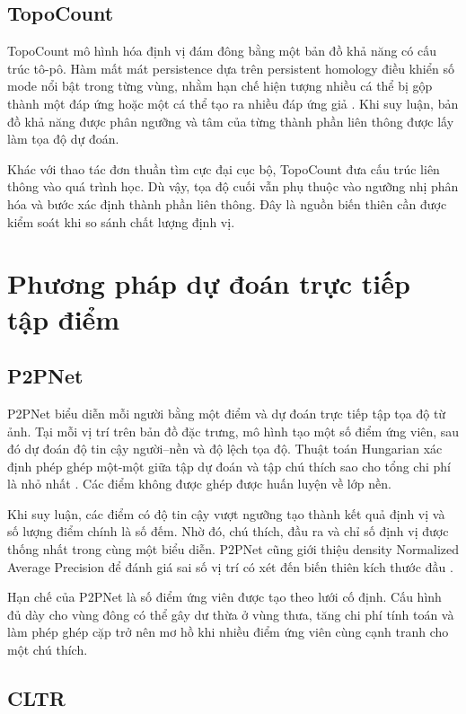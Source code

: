 \subsection{TopoCount}

TopoCount mô hình hóa định vị đám đông bằng một bản đồ khả năng có cấu trúc tô-pô. Hàm mất mát persistence dựa trên persistent homology điều khiển số mode nổi bật trong từng vùng, nhằm hạn chế hiện tượng nhiều cá thể bị gộp thành một đáp ứng hoặc một cá thể tạo ra nhiều đáp ứng giả \cite{abousamra2021topocount}. Khi suy luận, bản đồ khả năng được phân ngưỡng và tâm của từng thành phần liên thông được lấy làm tọa độ dự đoán.

Khác với thao tác đơn thuần tìm cực đại cục bộ, TopoCount đưa cấu trúc liên thông vào quá trình học. Dù vậy, tọa độ cuối vẫn phụ thuộc vào ngưỡng nhị phân hóa và bước xác định thành phần liên thông. Đây là nguồn biến thiên cần được kiểm soát khi so sánh chất lượng định vị.

\section{Phương pháp dự đoán trực tiếp tập điểm}

\subsection{P2PNet}

P2PNet biểu diễn mỗi người bằng một điểm và dự đoán trực tiếp tập tọa độ từ ảnh. Tại mỗi vị trí trên bản đồ đặc trưng, mô hình tạo một số điểm ứng viên, sau đó dự đoán độ tin cậy người--nền và độ lệch tọa độ. Thuật toán Hungarian xác định phép ghép một-một giữa tập dự đoán và tập chú thích sao cho tổng chi phí là nhỏ nhất \cite{song2021p2pnet}. Các điểm không được ghép được huấn luyện về lớp nền.

Khi suy luận, các điểm có độ tin cậy vượt ngưỡng tạo thành kết quả định vị và số lượng điểm chính là số đếm. Nhờ đó, chú thích, đầu ra và chỉ số định vị được thống nhất trong cùng một biểu diễn. P2PNet cũng giới thiệu density Normalized Average Precision để đánh giá sai số vị trí có xét đến biến thiên kích thước đầu \cite{song2021p2pnet}.

Hạn chế của P2PNet là số điểm ứng viên được tạo theo lưới cố định. Cấu hình đủ dày cho vùng đông có thể gây dư thừa ở vùng thưa, tăng chi phí tính toán và làm phép ghép cặp trở nên mơ hồ khi nhiều điểm ứng viên cùng cạnh tranh cho một chú thích.

\subsection{CLTR}

